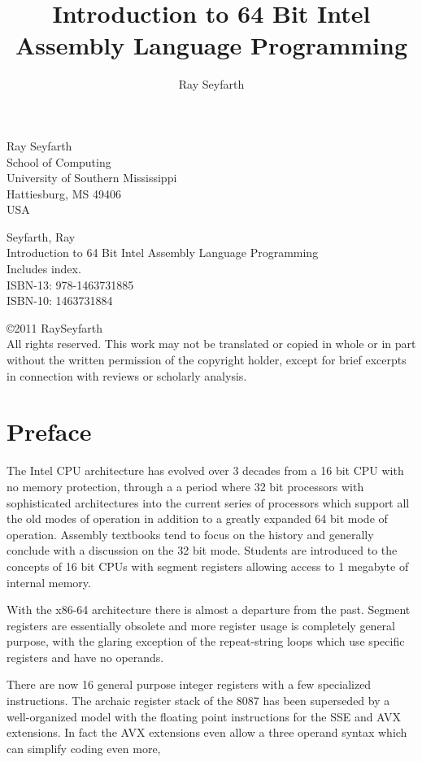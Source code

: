 \documentclass[11pt,b5paper]{book}
\title{Introduction to 64 Bit Intel Assembly Language Programming}
\author{Ray Seyfarth}
\begin{document}
\frontmatter

\maketitle
\thispagestyle{empty}


\noindent
Ray Seyfarth \\
School of Computing\\
University of Southern Mississippi\\
Hattiesburg, MS 49406\\
USA

\vfill
\noindent
Seyfarth, Ray \\
\qquad    Introduction to 64 Bit Intel Assembly Language Programming\\
\qquad    Includes index.\\
\qquad    ISBN-13: 978-1463731885\\
\qquad    ISBN-10: 1463731884

\vfill
\noindent
\copyright 2011 RaySeyfarth \\
All rights reserved.  This work may not be translated or copied in whole or in
part without the written permission of the copyright holder, except for brief
excerpts in connection with reviews or scholarly analysis.



\chapter{Preface}

The Intel CPU architecture has evolved over 3 decades from a 16 bit CPU with
no memory protection, through a a period where 32 bit processors with sophisticated architectures into the current series of processors which
support all the old modes of operation in addition to a greatly expanded
64 bit mode of operation.
Assembly textbooks tend to focus on the history and generally conclude with
a discussion on the 32 bit mode.
Students are introduced to the concepts of 16 bit CPUs with segment registers
allowing access to 1 megabyte of internal memory.

With the x86-64 architecture there is almost a departure from the past.
Segment registers are essentially obsolete and more register usage is
completely general purpose, with the glaring exception of the repeat-string
loops which use specific registers and have no operands.

There are now 16 general purpose integer registers with a few specialized instructions.
The archaic register stack of the 8087 has been superseded by a well-organized
model with the floating point instructions for the SSE and AVX extensions.
In fact the AVX extensions even allow a three operand syntax which can
simplify coding even more,
\end{document}

